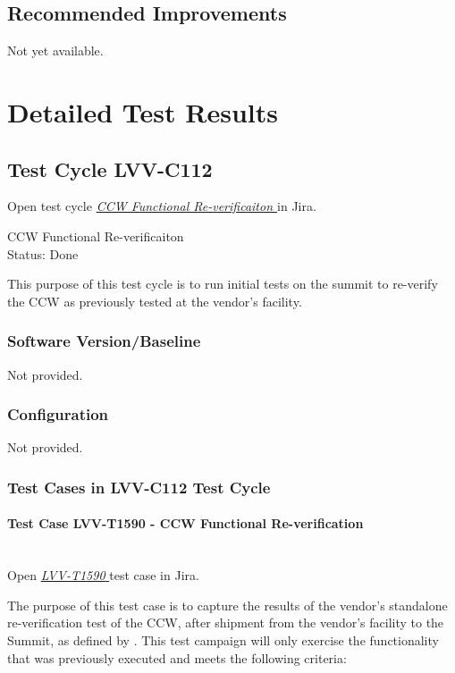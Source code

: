 \documentclass[SE,lsstdraft,STR,toc]{lsstdoc}
\begin{document}
\subsection{Recommended Improvements}
\label{sect:recommendations}

Not yet available.

\newpage
\section{Detailed Test Results}
\label{sect:detailedtestresults}

\subsection{Test Cycle LVV-C112 }

Open test cycle {\it \href{https://jira.lsstcorp.org/secure/Tests.jspa#/testrun/LVV-C112}{ CCW Functional Re-verificaiton
}} in Jira.

 CCW Functional Re-verificaiton
\\
Status: Done

 This purpose of this test cycle is to run initial tests on the summit to
re-verify the CCW as previously tested at the vendor's facility.


\subsubsection{Software Version/Baseline}
Not provided.

\subsubsection{Configuration}
Not provided.

\subsubsection{Test Cases in LVV-C112 Test Cycle}

\paragraph{Test Case LVV-T1590 -  CCW Functional Re-verification
 }\mbox{}\\

Open  \href{https://jira.lsstcorp.org/secure/Tests.jspa#/testCase/LVV-T1590}{\textit{ LVV-T1590 } }
test case in Jira.

 The purpose of this test case is to capture the results of the vendor's
standalone re-verification test of the CCW, after shipment from the
vendor's facility to the Summit, as defined by . This test
campaign will only exercise the functionality that was previously
executed and meets the following criteria:
\end{document}
